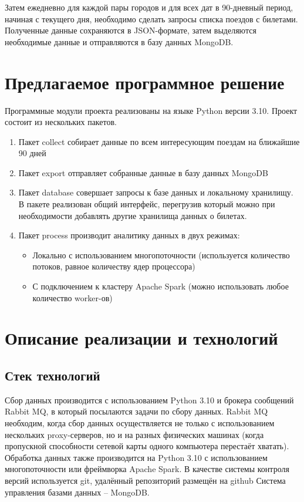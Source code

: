 \documentclass[conference]{IEEEtran}
\begin{document}
Затем ежедневно для каждой пары городов и для всех дат в 90-дневный период, начиная с текущего дня, необходимо сделать запросы списка поездов с билетами. Полученные данные сохраняются в JSON-формате, затем выделяются необходимые данные и отправляются в базу данных MongoDB.

\section{Предлагаемое программное решение}

Программные модули проекта реализованы на языке Python версии 3.10. Проект состоит из нескольких пакетов.

\begin{enumerate}
	\item Пакет collect собирает данные по всем интересующим поездам на ближайшие 90 дней
	
	\item Пакет export отправляет собранные данные в базу данных MongoDB
	
	\item Пакет database совершает запросы к базе данных и локальному хранилищу. В пакете реализован общий интерфейс, перегрузив который можно при необходимости добавлять другие хранилища данных о билетах.
	
	\item Пакет process производит аналитику данных в двух режимах:
	
	\begin{itemize}
		\item Локально с использованием многопоточности (используется количество потоков, равное количеству ядер процессора)
		
		\item С подключением к кластеру Apache Spark (можно использовать любое количество worker-ов)
	\end{itemize}
\end{enumerate}

\section{Описание реализации и технологий}

\subsection{Стек технологий}
Сбор данных производится с использованием Python 3.10 и брокера сообщений Rabbit MQ, в который посылаются задачи по сбору данных. Rabbit MQ необходим, когда сбор данных осуществляется не только с использованием нескольких proxy-серверов, но и на разных физических машинах (когда пропускной способности сетевой карты одного компьютера перестаёт хватать). Обработка данных также производится на Python 3.10 с использованием многопоточности или фреймворка Apache Spark. В качестве системы контроля версий используется git, удалённый репозиторий размещён на github %
Система управления базами данных -- MongoDB.
\end{document}
